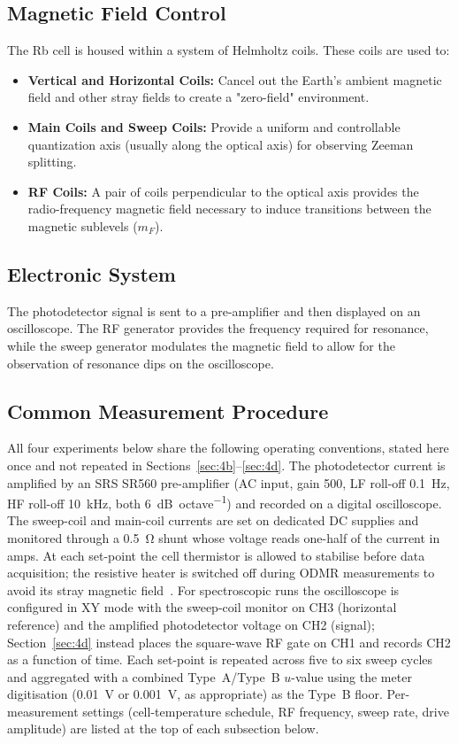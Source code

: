 \subsection{Magnetic Field Control}The Rb cell is housed within a system of Helmholtz coils.
These coils are used to:
\begin{itemize}
    \item \textbf{Vertical and Horizontal Coils:} Cancel out the Earth’s ambient magnetic field and
    other stray fields to create a "zero-field" environment.
    \item \textbf{Main Coils and Sweep Coils:} Provide a uniform and controllable quantization axis (usually along the optical axis) for observing Zeeman splitting.
    \item \textbf{RF Coils:} A pair of coils perpendicular to the optical axis provides the radio-frequency magnetic field necessary to induce transitions between the magnetic sublevels ($m_F$).
\end{itemize}

\subsection{Electronic System}The photodetector signal is sent to a pre-amplifier and then displayed on an oscilloscope. The RF generator provides the frequency required for resonance, while the sweep generator modulates the magnetic field to allow for the observation of resonance dips on the oscilloscope.

\subsection{Common Measurement Procedure}\label{sec:common_procedure}
All four experiments below share the following operating conventions, stated
here once and not repeated in Sections~\ref{sec:4b}--\ref{sec:4d}. The
photodetector current is amplified by an SRS SR560 pre-amplifier (AC input,
gain 500, LF roll-off \SI{0.1}{\hertz}, HF roll-off \SI{10}{\kilo\hertz}, both
\SI{6}{dB\per octave}) and recorded on a digital oscilloscope. The sweep-coil
and main-coil currents are set on dedicated DC supplies and monitored through
a \SI{0.5}{\ohm} shunt whose voltage reads one-half of the current in amps.
At each set-point the cell thermistor is allowed to stabilise before data
acquisition; the resistive heater is switched off during ODMR measurements to
avoid its stray magnetic field~\cite{OpticalPumpingRubidium2002}. For
spectroscopic runs the oscilloscope is configured in XY mode with the
sweep-coil monitor on CH3 (horizontal reference) and the amplified
photodetector voltage on CH2 (signal); Section~\ref{sec:4d} instead places
the square-wave RF gate on CH1 and records CH2 as a function of time. Each
set-point is repeated across five to six sweep cycles and aggregated with a
combined Type~A/Type~B $u$-value using the meter digitisation
(\SI{0.01}{\volt} or \SI{0.001}{\volt}, as appropriate) as the Type~B floor.
Per-measurement settings (cell-temperature schedule, RF frequency, sweep
rate, drive amplitude) are listed at the top of each subsection below.
